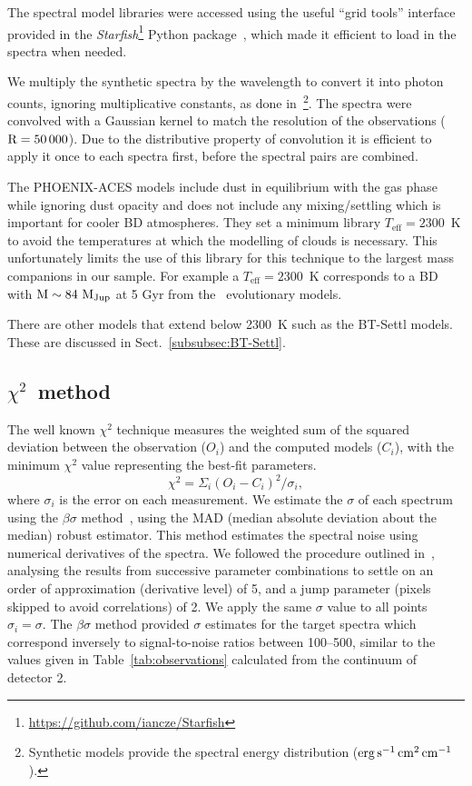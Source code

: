 

The spectral model libraries were accessed using the useful ``grid tools'' interface provided in the \emph{Starfish}\footnote{\url{https://github.com/iancze/Starfish}} Python package~\citep{czekala_constructing_2015}, which made it efficient to load in the spectra when needed.

We multiply the synthetic spectra by the wavelength to convert it into photon counts, ignoring multiplicative constants, as done in~\citet{figueira_radial_2016}\footnote{Synthetic models provide the spectral energy distribution (\(\rm erg\,s^{-1}\,cm^{2}\,cm^{-1}\)).}. The spectra were convolved with a Gaussian kernel to match the resolution of the observations (\(\rm R=50\,000\)). Due to the distributive property of convolution it is efficient to apply it once to each spectra first, before the spectral pairs are combined.

The PHOENIX-ACES models include dust in equilibrium with the gas phase while ignoring dust opacity and does not include any mixing/settling which is important for cooler BD atmospheres. They set a minimum library \(T_{\textrm{eff}}=2300\)~K to avoid the temperatures at which the modelling of clouds is necessary. This unfortunately limits the use of this library for this technique to the largest mass companions in our sample. For example a \(T_{\textrm{eff}}=2300\)~K corresponds to a BD with \(\rm M\sim84~M_{Jup}\) at 5 Gyr from the~\citet{baraffe_evolutionary_2003} evolutionary models. 

There are other models that extend below 2300~K such as the {BT-Settl} models\citep{allard_btsettl_2013,baraffe_new_2015}. These are discussed in Sect.~\ref{subsubsec:BT-Settl}.


\subsection{\texorpdfstring{\(\chi^{2}\)}\ \ method}
\label{subsec:chi2}
The well known \(\chi^{2} \) technique measures the weighted sum of the squared deviation between the observation (\({O}_{i}\)) and the computed models (\(C_{i}\)), with the minimum \(\chi^2\) value representing the best-fit parameters.
\[\chi^{2} = {\Sigma}_i { (O_{i} - C_{i})}^2 / {\sigma}_{i}, \] where \({\sigma}_{i}\) is the error on each measurement. We estimate the \(\sigma\) of each spectrum using the \(\beta\sigma\) method~\citep{czesla_posteriori_2018}, using the MAD (median absolute deviation about the median) robust estimator. {\rd{} This method estimates the spectral noise using numerical derivatives of the spectra. We followed the procedure outlined in~\citet{czesla_posteriori_2018}, analysing the results from successive parameter combinations to settle on an order of approximation (derivative level) of 5, and a jump parameter (pixels skipped to avoid correlations) of 2.} We apply the same \(\sigma\) value to all points \({\sigma}_{i} = \sigma\). The \(\beta\sigma\) method provided \(\sigma\) estimates for the target spectra which correspond inversely to signal-to-noise ratios between 100--500, {\rd{} similar to the values given in Table~\ref{tab:observations} calculated from the continuum of detector 2.}

